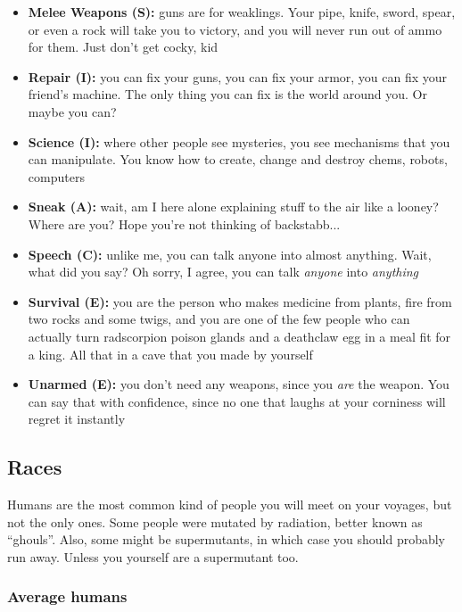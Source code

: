 \documentclass[11pt]{article} %
\begin{document}
\begin{itemize}
	\item \textbf{Melee Weapons (S):} guns are for weaklings. Your pipe, knife, sword, spear, or even a rock will take you to victory, and you will never run out of ammo for them. Just don't get cocky, kid
	
	\item \textbf{Repair (I):} you can fix your guns, you can fix your armor, you can fix your friend's machine. The only thing you can fix is the world around you. Or maybe you can?
	
	\item \textbf{Science (I):} where other people see mysteries, you see mechanisms that you can manipulate. You know how to create, change and destroy chems, robots, computers
	
	\item \textbf{Sneak (A):} wait, am I here alone explaining stuff to the air like a looney? Where are you? Hope you're not thinking of backstabb... 
	
	\item \textbf{Speech (C):} unlike me, you can talk anyone into almost anything. Wait, what did you say? Oh sorry, I agree, you can talk \textit{anyone} into \textit{anything}
	
	\item \textbf{Survival (E):} you are the person who makes medicine from plants, fire from two rocks and some twigs, and you are one of the few people who can actually turn radscorpion poison glands and a deathclaw egg in a meal fit for a king. All that in a cave that you made by yourself
	
	\item \textbf{Unarmed (E):} you don't need any weapons, since you \textit{are} the weapon. You can say that with confidence, since no one that laughs at your corniness will regret it instantly

\end{itemize}

\subsection{Races}

Humans are the most common kind of people you will meet on your voyages, but not the only ones. Some people were mutated by radiation, better known as ``ghouls''. Also, some might be supermutants, in which case you should probably run away. Unless you yourself are a supermutant too.

\subsubsection{Average humans} 
\end{document}
